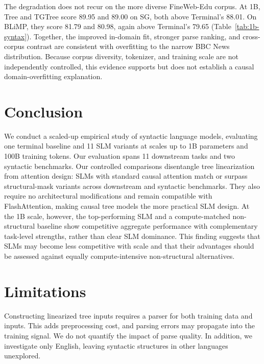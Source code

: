 \documentclass[11pt]{article}
\begin{document}
The degradation does not recur on the more diverse FineWeb-Edu corpus. At 1B, Tree and TGTree score 89.95 and 89.00 on SG, both above Terminal's 88.01. On BLiMP, they score 81.79 and 80.98, again above Terminal's 79.65 (Table~\ref{tab:1b-syntax}). Together, the improved in-domain fit, stronger parse ranking, and cross-corpus contrast are consistent with overfitting to the narrow BBC News distribution. Because corpus diversity, tokenizer, and training scale are not independently controlled, this evidence supports but does not establish a causal domain-overfitting explanation.

\section{Conclusion}

We conduct a scaled-up empirical study of syntactic language models, evaluating one terminal baseline and 11 SLM variants at scales up to 1B parameters and 100B training tokens. Our evaluation spans 11 downstream tasks and two syntactic benchmarks. Our controlled comparisons disentangle tree linearization from attention design: SLMs with standard causal attention match or surpass structural-mask variants across downstream and syntactic benchmarks. They also require no architectural modifications and remain compatible with FlashAttention, making causal tree models the more practical SLM design. At the 1B scale, however, the top-performing SLM and a compute-matched non-structural baseline show competitive aggregate performance with complementary task-level strengths, rather than clear SLM dominance. This finding suggests that SLMs may become less competitive with scale and that their advantages should be assessed against equally compute-intensive non-structural alternatives.


\section*{Limitations}

Constructing linearized tree inputs requires a parser for both training data and inputs. This adds preprocessing cost, and parsing errors may propagate into the training signal. We do not quantify the impact of parse quality. In addition, we investigate only English, leaving syntactic structures in other languages unexplored.

\end{document}
